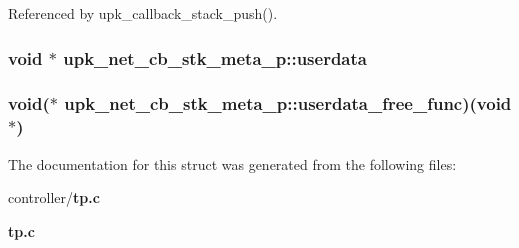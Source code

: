 Referenced by upk\_\-callback\_\-stack\_\-push().

\subsubsection[{userdata}]{\setlength{\rightskip}{0pt plus 5cm}void $\ast$ {\bf upk\_\-net\_\-cb\_\-stk\_\-meta\_\-p::userdata}}\label{structupk__net__cb__stk__meta__p_a0815bc9a11316dac3b446e0ca00c49a1}
\subsubsection[{userdata\_\-free\_\-func}]{\setlength{\rightskip}{0pt plus 5cm}void($\ast$ {\bf upk\_\-net\_\-cb\_\-stk\_\-meta\_\-p::userdata\_\-free\_\-func})(void $\ast$)}\label{structupk__net__cb__stk__meta__p_ac2f59360143e119aaeb2cfb3f7f755ec}


The documentation for this struct was generated from the following files:\begin{DoxyCompactItemize}
\item 
controller/{\bf tp.c}\item 
{\bf tp.c}\end{DoxyCompactItemize}
